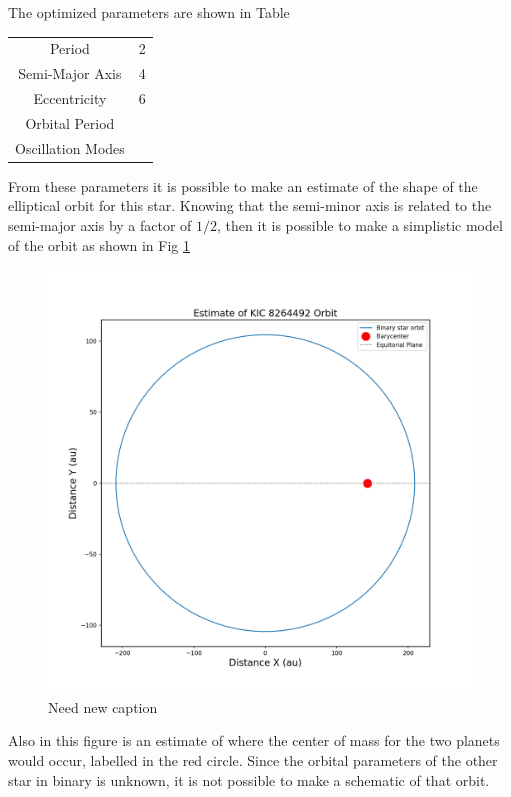 \documentclass[]{article}
\begin{document}
The optimized parameters are shown in Table 

\begin{tabular}{c|c}
\hline
    Period  & 2  \\
    Semi-Major Axis & 4\\
    Eccentricity & 6\\
    Orbital Period & \\
    Oscillation Modes & \\
\end{tabular}

\noindent
From these parameters it is possible to make an estimate of the shape of the elliptical orbit for this star. Knowing that the semi-minor axis is related to the semi-major axis by a factor of $1/2$, then it is possible to make a simplistic model of the orbit as shown in Fig \ref{fig:Orbit}

\begin{figure}[H]
    \centering
    \includegraphics[width=1\linewidth]{orbit.png}
    \caption{Need new caption}
    \label{fig:Orbit}
\end{figure}

Also in this figure is an estimate of where the center of mass for the two planets would occur, labelled in the red circle. 
Since the orbital parameters of the other star in binary is unknown, it is not possible to make a schematic of that orbit.
\end{document}
